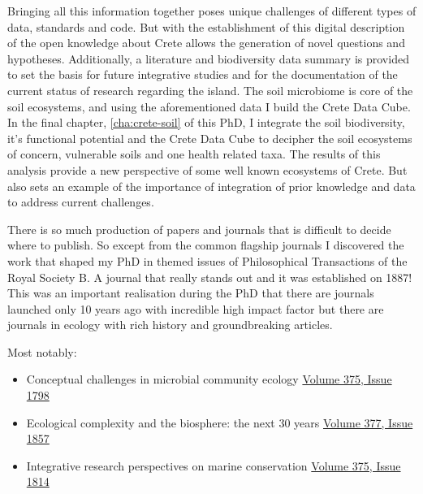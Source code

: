 \documentclass[
11pt, %
english, %
singlespacing, %
liststotoc, %
toctotoc, %
headsepline, %
]{MastersDoctoralThesis} %
\begin{document}
Bringing all this information together poses unique challenges of different types of data, standards and code. 
But with the establishment of this digital description of the open knowledge about Crete allows the generation of novel questions and hypotheses.
Additionally, a literature and biodiversity data summary is 
provided to set the basis for future integrative studies and for the documentation of the current status of 
research regarding the island.
The soil microbiome is core of the soil ecosystems, and using the aforementioned data I build the Crete Data Cube.
In the final chapter, \ref{cha:crete-soil} of this PhD, I integrate the soil biodiversity, it's functional potential and 
the Crete Data Cube to decipher the soil ecosystems of concern, vulnerable soils and one health related taxa. The results 
of this analysis provide a new perspective of some well known ecosystems of Crete.
But also sets an example of the importance of integration of prior knowledge and data to address current challenges.

There is so much production of papers and journals that is difficult to decide where to publish. 
So except from the common flagship journals I discovered the work that shaped my 
PhD in themed issues of Philosophical Transactions of the Royal Society B.
A journal that really stands out and it was established on 1887! This was an
important realisation during the PhD that there are journals launched only 10 years
ago with incredible high impact factor but there are journals in ecology
with rich history and groundbreaking articles.

Most notably:

\begin{itemize}
    \item Conceptual challenges in microbial community ecology \href{https://doi.org/10.1098/rstb.2019.0241}{Volume 375, Issue 1798}
    \item Ecological complexity and the biosphere: the next 30 years \href{https://doi.org/10.1098/rstb.2021.0376}{Volume 377, Issue 1857}
    \item Integrative research perspectives on marine conservation \href{https://doi.org/10.1098/rstb.2019.0444}{Volume 375, Issue 1814}
\end{itemize}
\end{document}
